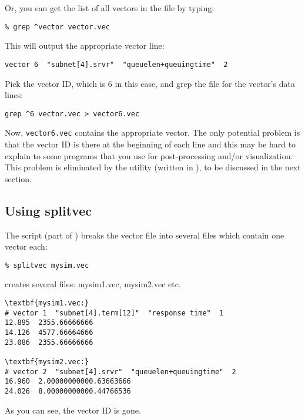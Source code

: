 Or, you can get the list of all vectors in the file by typing:

\begin{Verbatim}
% grep ^vector vector.vec
\end{Verbatim}

This will output the appropriate vector line:

\begin{Verbatim}
vector 6  "subnet[4].srvr"  "queuelen+queuingtime"  2
\end{Verbatim}

Pick the vector ID, which is 6 in this case, and grep the file 
for the vector's data lines:

\begin{Verbatim}
grep ^6 vector.vec > vector6.vec
\end{Verbatim}


Now, \texttt{vector6.vec} contains the appropriate vector. The only
potential problem is that the vector ID is there at the beginning of
each line and this may be hard to explain to some programs that you
use for post-processing and/or visualization. This problem is
eliminated by the {\opp}  utility (written in
), to be discussed in the next section.




\subsection{Using splitvec}

The  script (part of {\opp}) breaks the vector file
into several files which contain one vector each:

\begin{Verbatim}
% splitvec mysim.vec
\end{Verbatim}


creates several files: mysim1.vec, mysim2.vec etc.

\begin{Verbatim}[commandchars=\\\{\}]
\textbf{mysim1.vec:}
# vector 1  "subnet[4].term[12]"  "response time"  1
12.895  2355.66666666
14.126  4577.66664666
23.086  2355.66666666

\textbf{mysim2.vec:}
# vector 2  "subnet[4].srvr"  "queuelen+queuingtime"  2
16.960  2.00000000000.63663666
24.026  8.00000000000.44766536
\end{Verbatim}


As you can see, the vector ID is gone.

